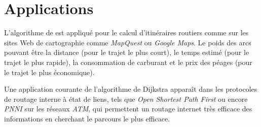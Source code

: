 \documentclass[a4paper,11pt]{scrartcl}
\theoremstyle{plain}
\theoremstyle{definition}
\newcommand{\dijkstra}{\nom{Dijkstra}}
\newcommand{\nom}[1]{\bsc{#1}\xspace}
\newcommand{\algo}{algorithme de \dijkstra}
\newcommand{\glms}[1]{\og#1\fg}
\begin{document}




\section{Applications}
L'\algo est appliqué pour le calcul d'itinéraires routiers
comme sur les sites Web de cartographie comme \textit{MapQuest} ou
\textit{Google Maps}.
Le poids des arcs pouvant être la distance (pour le trajet le plus court),
le temps estimé (pour le trajet le plus rapide), la consommation de carburant
et le prix des péages (pour le trajet le plus économique).

Une application courante de l'algorithme de Dijkstra apparaît dans les
protocoles de routage interne \glms{à état de liens}, tels que
\textit{Open Shortest Path First} ou encore \textit{PNNI} sur les réseaux
\textit{ATM}, qui permettent un routage internet très efficace des
informations en cherchant le parcours le plus efficace.



\end{document}
